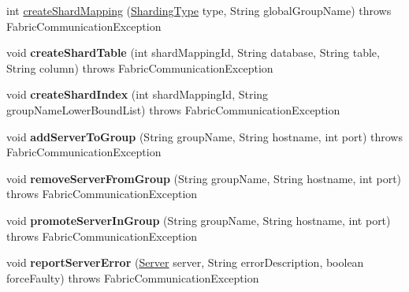 \begin{DoxyCompactItemize}
\item 
int \mbox{\hyperlink{classcom_1_1mysql_1_1fabric_1_1proto_1_1xmlrpc_1_1_xml_rpc_client_a90a46aa65d36a3b282a2e10bce2656ee}{create\+Shard\+Mapping}} (\mbox{\hyperlink{enumcom_1_1mysql_1_1fabric_1_1_sharding_type}{Sharding\+Type}} type, String global\+Group\+Name)  throws Fabric\+Communication\+Exception 
\item 
\mbox{\label{classcom_1_1mysql_1_1fabric_1_1proto_1_1xmlrpc_1_1_xml_rpc_client_a4cc8e481181ee81d309a25d47e49deba}} 
void {\bfseries create\+Shard\+Table} (int shard\+Mapping\+Id, String database, String table, String column)  throws Fabric\+Communication\+Exception 
\item 
\mbox{\label{classcom_1_1mysql_1_1fabric_1_1proto_1_1xmlrpc_1_1_xml_rpc_client_a5c3b829c1ea56c98b3d6a84413468511}} 
void {\bfseries create\+Shard\+Index} (int shard\+Mapping\+Id, String group\+Name\+Lower\+Bound\+List)  throws Fabric\+Communication\+Exception 
\item 
\mbox{\label{classcom_1_1mysql_1_1fabric_1_1proto_1_1xmlrpc_1_1_xml_rpc_client_a8e3edc0d2a4f2410484cd24576ef5702}} 
void {\bfseries add\+Server\+To\+Group} (String group\+Name, String hostname, int port)  throws Fabric\+Communication\+Exception 
\item 
\mbox{\label{classcom_1_1mysql_1_1fabric_1_1proto_1_1xmlrpc_1_1_xml_rpc_client_a084138b62bcbe11860d25be57caa66ae}} 
void {\bfseries remove\+Server\+From\+Group} (String group\+Name, String hostname, int port)  throws Fabric\+Communication\+Exception 
\item 
\mbox{\label{classcom_1_1mysql_1_1fabric_1_1proto_1_1xmlrpc_1_1_xml_rpc_client_ad62e69f6d208839236a530a9251a0836}} 
void {\bfseries promote\+Server\+In\+Group} (String group\+Name, String hostname, int port)  throws Fabric\+Communication\+Exception 
\item 
\mbox{\label{classcom_1_1mysql_1_1fabric_1_1proto_1_1xmlrpc_1_1_xml_rpc_client_a768c30282c7c3df672972f589a1c3c8a}} 
void {\bfseries report\+Server\+Error} (\mbox{\hyperlink{classcom_1_1mysql_1_1fabric_1_1_server}{Server}} server, String error\+Description, boolean force\+Faulty)  throws Fabric\+Communication\+Exception 
\end{DoxyCompactItemize}


